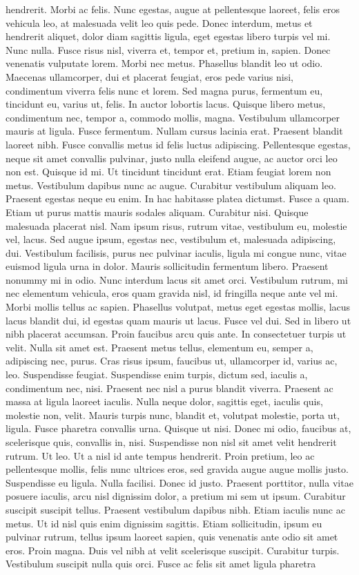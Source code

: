 hendrerit. Morbi ac felis. Nunc egestas, augue at pellentesque laoreet, felis eros vehicula leo, at malesuada velit leo quis pede. Donec interdum, metus et hendrerit aliquet, dolor diam sagittis ligula, eget egestas libero turpis vel mi. Nunc nulla. Fusce risus nisl, viverra et, tempor et, pretium in, sapien. Donec venenatis vulputate lorem. Morbi nec metus. Phasellus blandit leo ut odio. Maecenas ullamcorper, dui et placerat feugiat, eros pede varius nisi, condimentum viverra felis nunc et lorem. Sed magna purus, fermentum eu, tincidunt eu, varius ut, felis. In auctor lobortis lacus. Quisque libero metus, condimentum nec, tempor a, commodo mollis, magna. Vestibulum ullamcorper mauris at ligula. Fusce fermentum. Nullam cursus lacinia erat. Praesent blandit laoreet nibh. Fusce convallis metus id felis luctus adipiscing. Pellentesque egestas, neque sit amet convallis pulvinar, justo nulla eleifend augue, ac auctor orci leo non est. Quisque id mi. Ut tincidunt tincidunt erat. Etiam feugiat lorem non metus. Vestibulum dapibus nunc ac augue. Curabitur vestibulum aliquam leo. Praesent egestas neque eu enim. In hac habitasse platea dictumst. Fusce a quam. Etiam ut purus mattis mauris sodales aliquam. Curabitur nisi. Quisque malesuada placerat nisl. Nam ipsum risus, rutrum vitae, vestibulum eu, molestie vel, lacus. Sed augue ipsum, egestas nec, vestibulum et, malesuada adipiscing, dui. Vestibulum facilisis, purus nec pulvinar iaculis, ligula mi congue nunc, vitae euismod ligula urna in dolor. Mauris sollicitudin fermentum libero. Praesent nonummy mi in odio. Nunc interdum lacus sit amet orci. Vestibulum rutrum, mi nec elementum vehicula, eros quam gravida nisl, id fringilla neque ante vel mi. Morbi mollis tellus ac sapien. Phasellus volutpat, metus eget egestas mollis, lacus lacus blandit dui, id egestas quam mauris ut lacus. Fusce vel dui. Sed in libero ut nibh placerat accumsan. Proin faucibus arcu quis ante. In consectetuer turpis ut velit. Nulla sit amet est. Praesent metus tellus, elementum eu, semper a, adipiscing nec, purus. Cras risus ipsum, faucibus ut, ullamcorper id, varius ac, leo. Suspendisse feugiat. Suspendisse enim turpis, dictum sed, iaculis a, condimentum nec, nisi. Praesent nec nisl a purus blandit viverra. Praesent ac massa at ligula laoreet iaculis. Nulla neque dolor, sagittis eget, iaculis quis, molestie non, velit. Mauris turpis nunc, blandit et, volutpat molestie, porta ut, ligula. Fusce pharetra convallis urna. Quisque ut nisi. Donec mi odio, faucibus at, scelerisque quis, convallis in, nisi. Suspendisse non nisl sit amet velit hendrerit rutrum. Ut leo. Ut a nisl id ante tempus hendrerit. Proin pretium, leo ac pellentesque mollis, felis nunc ultrices eros, sed gravida augue augue mollis justo. Suspendisse eu ligula. Nulla facilisi. Donec id justo. Praesent porttitor, nulla vitae posuere iaculis, arcu nisl dignissim dolor, a pretium mi sem ut ipsum. Curabitur suscipit suscipit tellus. Praesent vestibulum dapibus nibh. Etiam iaculis nunc ac metus. Ut id nisl quis enim dignissim sagittis. Etiam sollicitudin, ipsum eu pulvinar rutrum, tellus ipsum laoreet sapien, quis venenatis ante odio sit amet eros. Proin magna. Duis vel nibh at velit scelerisque suscipit. Curabitur turpis. Vestibulum suscipit nulla quis orci. Fusce ac felis sit amet ligula pharetra 